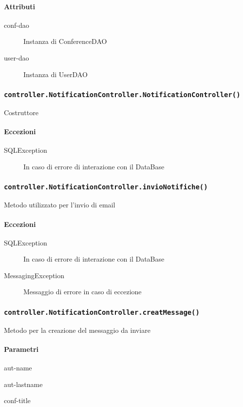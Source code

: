 \paragraph{Attributi}
\begin{description}
\item[conf-dao] Instanza di ConferenceDAO
\item[user-dao] Instanza di UserDAO
\end{description}

\subsubsection{\texttt{controller.NotificationController.NotificationController()}}
Costruttore
\paragraph{Eccezioni}
\begin{description}
\item[SQLException] In caso di errore di interazione con il DataBase
\end{description}

\subsubsection{\texttt{controller.NotificationController.invioNotifiche()}}
Metodo utilizzato per l'invio di email
\paragraph{Eccezioni}
\begin{description}
\item[SQLException] In caso di errore di interazione con il DataBase
\item[MessagingException] Messaggio di errore in caso di eccezione
\end{description}


\subsubsection{\texttt{controller.NotificationController.creatMessage()}}
Metodo per la creazione del messaggio da inviare
\paragraph{Parametri}
\begin{description}
\item aut-name
\item aut-lastname
\item conf-title
\end{description}

